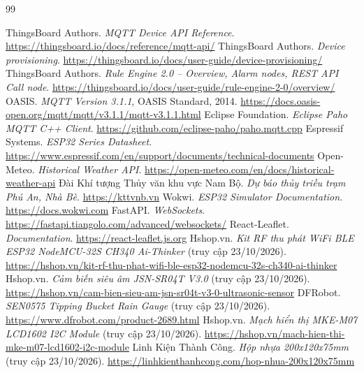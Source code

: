 \documentclass[12pt,a4paper]{article}
\begin{document}
\begin{thebibliography}{99}
\setlength{\itemsep}{2pt}
 ThingsBoard Authors. \textit{MQTT Device API Reference}. \url{https://thingsboard.io/docs/reference/mqtt-api/}
 ThingsBoard Authors. \textit{Device provisioning}. \url{https://thingsboard.io/docs/user-guide/device-provisioning/}
 ThingsBoard Authors. \textit{Rule Engine 2.0 -- Overview, Alarm nodes, REST API Call node}. \url{https://thingsboard.io/docs/user-guide/rule-engine-2-0/overview/}
 OASIS. \textit{MQTT Version 3.1.1}, OASIS Standard, 2014. \url{https://docs.oasis-open.org/mqtt/mqtt/v3.1.1/mqtt-v3.1.1.html}
 Eclipse Foundation. \textit{Eclipse Paho MQTT C++ Client}. \url{https://github.com/eclipse-paho/paho.mqtt.cpp}
 Espressif Systems. \textit{ESP32 Series Datasheet}. \url{https://www.espressif.com/en/support/documents/technical-documents}
 Open-Meteo. \textit{Historical Weather API}. \url{https://open-meteo.com/en/docs/historical-weather-api}
 Đài Khí tượng Thủy văn khu vực Nam Bộ. \textit{Dự báo thủy triều trạm Phú An, Nhà Bè}. \url{https://kttvnb.vn}
 Wokwi. \textit{ESP32 Simulator Documentation}. \url{https://docs.wokwi.com}
 FastAPI. \textit{WebSockets}. \url{https://fastapi.tiangolo.com/advanced/websockets/}
 React-Leaflet. \textit{Documentation}. \url{https://react-leaflet.js.org}
 Hshop.vn. \textit{Kit RF thu phát WiFi BLE ESP32 NodeMCU-32S CH340 Ai-Thinker} (truy cập 23/10/2026). \url{https://hshop.vn/kit-rf-thu-phat-wifi-ble-esp32-nodemcu-32s-ch340-ai-thinker}
 Hshop.vn. \textit{Cảm biến siêu âm JSN-SR04T V3.0} (truy cập 23/10/2026). \url{https://hshop.vn/cam-bien-sieu-am-jsn-sr04t-v3-0-ultrasonic-sensor}
 DFRobot. \textit{SEN0575 Tipping Bucket Rain Gauge} (truy cập 23/10/2026). \url{https://www.dfrobot.com/product-2689.html}
 Hshop.vn. \textit{Mạch hiển thị MKE-M07 LCD1602 I2C Module} (truy cập 23/10/2026). \url{https://hshop.vn/mach-hien-thi-mke-m07-lcd1602-i2c-module}
 Linh Kiện Thành Công. \textit{Hộp nhựa 200x120x75mm} (truy cập 23/10/2026). \url{https://linhkienthanhcong.com/hop-nhua-200x120x75mm}
\end{thebibliography}
\end{document}
